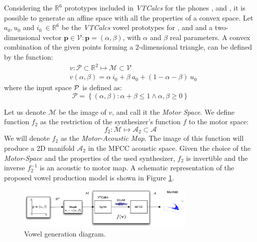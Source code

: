 Considering the $\mathds{R}^{6}$ prototypes included in \emph{VTCalcs}
for the phones \textipa{[i]},\textipa{[a]} and \textipa{[u]}, it is
possible to generate an affine space with all the properties of a
convex space. Let  $a_{0}, u_{0}$ and $i_{0} \ \in  \mathds{R}^6$ be
the \emph{VTCalcs}  vowel prototypes for \textipa{[i]}, \textipa{[u]}
and \textipa{[a]}
and a two-dimensional vector $\mathbf{p} \in \mathcal{V} : \mathbf{p} = (\alpha, \beta)$, with $\alpha$ and $\beta$ real parameters.
A convex combination of the given points forming a 2-dimensional
triangle, can be defined by the function:
\begin{eqnarray*}
 & v : \mathcal{P} \subset \mathds{R}^2 \mapsto \mathcal{M} \subset \mathcal{V} \\
 & v(\alpha, \beta) = \alpha\  i_{0}+\beta\  a_{0}+ (1-\alpha-\beta) \ u_{0}
\end{eqnarray*}
where the input space $\cal P$ is defined as:
\begin{equation*}
\mathcal{P} = \left\{ (\alpha, \beta) : \alpha + \beta \leq 1  \land  \alpha , \beta \geq 0 \right\}
\end{equation*}

Let us denote $\mathcal{M}$ be the image of $v$, and call it the
\textit{Motor Space}. We define function $f_2$ as the restriction of
the synthesizer's function $f$ to the motor space:
\begin{equation}
f_2 : \mathcal{M} \mapsto \mathcal{A}_2 \subset \mathcal{A}
\end{equation} 
We will denote $f_2$ as the \textit{Motor-Acoustic Map}. The image of
this function will produce a 2D manifold $\mathcal{A}_2$ in the MFCC
acoustic space. Given the choice of the \textit{Motor-Space} and the
properties of the used synthesizer, $f_2$ is invertible and the
inverse $f_{2}^{-1}$ is an acoustic to motor map. A schematic
representation of the proposed vowel production model is shown in
Figure \ref{fig:diagram}.
\begin{figure}[!ht]
  \centering
  \includegraphics[width=85mm]{include/vowels/images/diagram}
  \caption{Vowel generation diagram.}
  \label{fig:diagram}
\end{figure}

